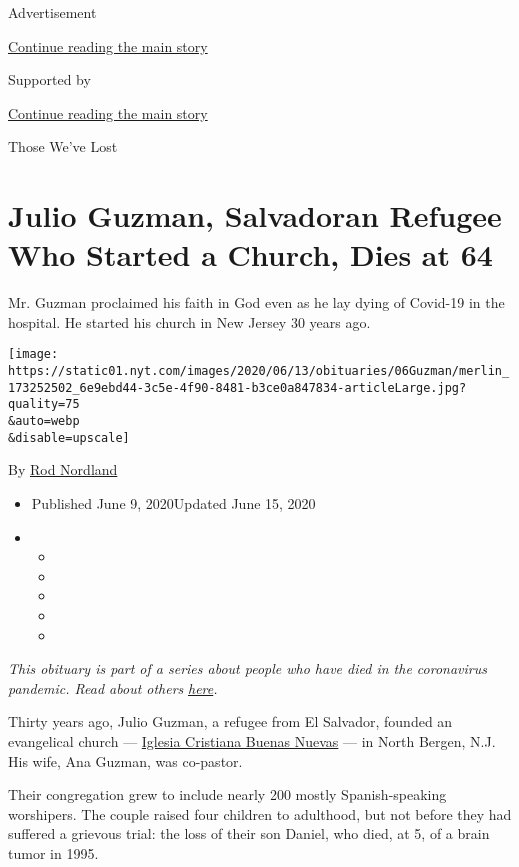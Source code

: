 Advertisement

\protect\hyperlink{after-top}{Continue reading the main story}

Supported by

\protect\hyperlink{after-sponsor}{Continue reading the main story}

Those We've Lost

\hypertarget{julio-guzman-salvadoran-refugee-who-started-a-church-dies-at-64}{%
\section{Julio Guzman, Salvadoran Refugee Who Started a Church, Dies at
64}\label{julio-guzman-salvadoran-refugee-who-started-a-church-dies-at-64}}

Mr. Guzman proclaimed his faith in God even as he lay dying of Covid-19
in the hospital. He started his church in New Jersey 30 years ago.

\texttt{[image: https://static01.nyt.com/images/2020/06/13/obituaries/06Guzman/merlin\_173252502\_6e9ebd44-3c5e-4f90-8481-b3ce0a847834-articleLarge.jpg?quality=75\\\&auto=webp\\\&disable=upscale]}

By \href{https://www.nytimes.com/by/rod-nordland}{Rod Nordland}

\begin{itemize}
\item
  Published June 9, 2020Updated June 15, 2020
\item
  \begin{itemize}
  \item
  \item
  \item
  \item
  \item
  \end{itemize}
\end{itemize}

\emph{This obituary is part of a series about people who have died in
the coronavirus pandemic. Read about others}
\href{https://www.nytimes.com/interactive/2020/obituaries/people-died-coronavirus-obituaries.html}{\emph{here}}\emph{.}

Thirty years ago, Julio Guzman, a refugee from El Salvador, founded an
evangelical church ---
\href{https://www.facebook.com/pages/Iglesia-Cristiana-Buenas-Nuevas/113296232037352}{Iglesia
Cristiana Buenas Nuevas} --- in North Bergen, N.J. His wife, Ana Guzman,
was co-pastor.

Their congregation grew to include nearly 200 mostly Spanish-speaking
worshipers. The couple raised four children to adulthood, but not before
they had suffered a grievous trial: the loss of their son Daniel, who
died, at 5, of a brain tumor in 1995.

